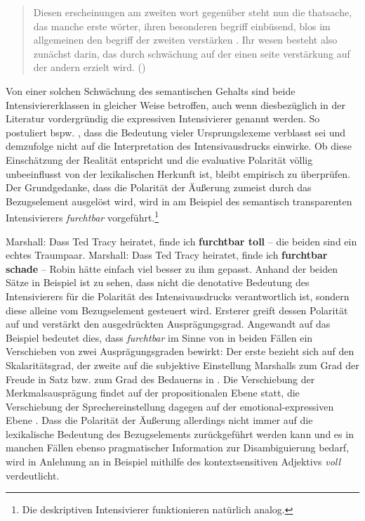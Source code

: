 \begin{quotation} \noindent Diesen erscheinungen am zweiten wort gegenüber steht nun die \textelp{} thatsache, da\textlongs s manche erste wörter, ihren besonderen begriff einbü\textlongs send, blo\textlongs s im allgemeinen den begriff der zweiten verstärken \textelp{}. Ihr wesen besteht also zunächst darin, da\textlongs s durch schwächung auf der einen seite verstärkung auf der andern erzielt wird. \hfill (\mbox{\citealt[105]{Tobler.1868}})  \end{quotation}

\noindent Von einer solchen Schwächung des semantischen Gehalts sind beide Intensiviererklassen in gleicher Weise betroffen, auch wenn diesbezüglich in der Literatur vordergründig die expressiven Intensivierer genannt werden. So postuliert bspw. \citet[15f.]{Nouwen.2020}, dass die Bedeutung vieler Ursprungslexeme verblasst sei und demzufolge nicht auf die Interpretation des Intensivausdrucks einwirke. Ob diese Einschätzung der Realität entspricht und die evaluative Polarität völlig unbeeinflusst von der lexikalischen Herkunft ist, bleibt empirisch zu überprüfen. Der Grundgedanke, dass die Polarität der Äußerung zumeist durch das Bezugselement ausgelöst wird, wird in  am Beispiel des semantisch transparenten Intensivierers \textit{furchtbar} vorgeführt.\footnote{Die deskriptiven Intensivierer funktionieren natürlich analog.}

\ea  \label{TedTra}
\ea Marshall: \glqq{}Dass Ted Tracy heiratet, finde ich \textbf{furchtbar toll} -- die beiden sind ein echtes Traumpaar.\grqq{} \label{mar}
\hfill \textbf{} \qquad \dSmiley[1.25][green!35]  \label{TedTra1}
\ex Marshall: \glqq{}Dass Ted Tracy heiratet, finde ich \textbf{furchtbar schade} -- Robin hätte einfach viel besser zu ihm gepasst.\grqq{} \label{rock}
\hfill  \textbf{} \qquad   \dSadey[1.25][orange!69]     \label{TedTra2}
 \z
 \z
Anhand der beiden Sätze in Beispiel  ist zu sehen, dass nicht die denotative Bedeutung des Intensivierers für die Polarität des Intensivausdrucks verantwortlich ist, sondern diese alleine vom Bezugselement gesteuert wird. Ersterer greift dessen Polarität auf und verstärkt den ausgedrückten Ausprägungsgrad. Angewandt auf das Beispiel bedeutet dies, dass \textit{furchtbar} im Sinne von \citet[132f.]{Gutzmann.2019a} in beiden Fällen ein Verschieben von zwei Ausprägungsgraden bewirkt: Der erste bezieht sich auf den Skalaritätsgrad, der zweite auf die subjektive Einstellung Marshalls zum Grad der Freude in {Satz } bzw. zum Grad des Bedauerns in . Die Verschiebung der Merkmalsausprägung findet auf der propositionalen Ebene statt, die Verschiebung der Sprechereinstellung dagegen auf der emotional-expressiven Ebene \citep[vgl.][133]{Gutzmann.2019a}. Dass die Polarität der Äußerung allerdings nicht immer auf die lexikalische Bedeutung des Bezugselements zurückgeführt werden kann und es in manchen Fällen ebenso pragmatischer Information zur Disambiguierung bedarf, wird in Anlehnung an {\citet[135]{Gutzmann.2019a}} in {Beispiel } mithilfe des kontextsensitiven Adjektivs \textit{voll} verdeutlicht.

